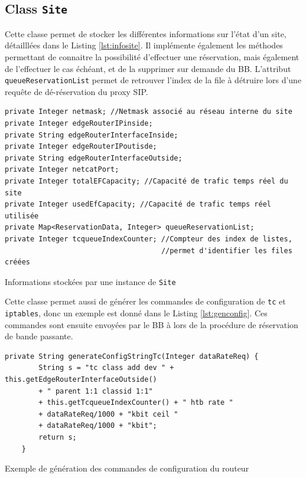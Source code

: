 \documentclass[a4paper,11pt]{article}
\let\Oldsubsection\subsection
\renewcommand{\subsection}{\FloatBarrier\Oldsubsection}
\begin{document}
\subsection{Class \texttt{Site}}

Cette classe permet de stocker les différentes informations sur l'état d'un site, détailllées dans le Listing \ref{lst:infosite}.
Il implémente également les méthodes permettant de connaitre la possibilité d'effectuer une réservation, mais également de l'effectuer le cas échéant, et de la  supprimer sur demande du BB.
L'attribut \texttt{queueReservationList} permet de retrouver l'index de la file à détruire lors d'une requête de dé-réservation du proxy SIP.

\begin{listing}[htp]
    \begin{verbatim}
private Integer netmask; //Netmask associé au réseau interne du site
private Integer edgeRouterIPinside;
private String edgeRouterInterfaceInside;
private Integer edgeRouterIPoutisde;
private String edgeRouterInterfaceOutside;
private Integer netcatPort;
private Integer totalEFCapacity; //Capacité de trafic temps réel du site
private Integer usedEfCapacity; //Capacité de trafic temps réel utilisée 
private Map<ReservationData, Integer> queueReservationList;
private Integer tcqueueIndexCounter; //Compteur des index de listes, 
                                     //permet d'identifier les files créées
    \end{verbatim}
    \caption{Informations stockées par une instance de \texttt{Site}}
    \label{lst:infosite}
\end{listing}

Cette classe permet aussi de générer les commandes de configuration de \texttt{tc} et \texttt{iptables}, donc un exemple est donné dans le Listing \ref{lst:genconfig}. Ces commandes sont ensuite envoyées par le BB à lors de la procédure de réservation de bande passante.

\begin{listing}[htp]
    \begin{verbatim}
private String generateConfigStringTc(Integer dataRateReq) {
        String s = "tc class add dev " + this.getEdgeRouterInterfaceOutside() 
        + " parent 1:1 classid 1:1"
        + this.getTcqueueIndexCounter() + " htb rate " 
        + dataRateReq/1000 + "kbit ceil " 
        + dataRateReq/1000 + "kbit";
        return s;
    }

    \end{verbatim}
    \caption{Exemple de génération des commandes de configuration du routeur}
    \label{lst:genconfig}
\end{listing}
\end{document}
